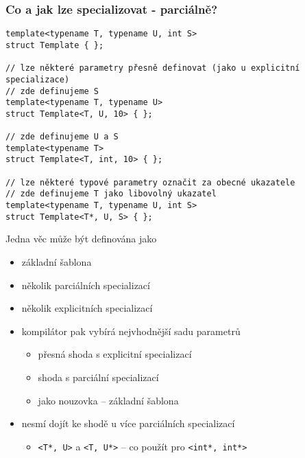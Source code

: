 \begin{frame}[fragile]
\frametitle{Co a jak lze specializovat - parciálně?}
\begin{yesblock}
\begin{lstlisting}[basicstyle=\small]
template<typename T, typename U, int S>
struct Template { }; 

// lze některé parametry přesně definovat (jako u explicitní specializace)
// zde definujeme S
template<typename T, typename U>
struct Template<T, U, 10> { }; 

// zde definujeme U a S
template<typename T>
struct Template<T, int, 10> { }; 

// lze některé typové parametry označit za obecné ukazatele
// zde definujeme T jako libovolný ukazatel
template<typename T, typename U, int S>
struct Template<T*, U, S> { }; 
\end{lstlisting}
\end{yesblock}
\end{frame}




\begin{frame}[fragile]
\begin{block}{Jedna věc může být definována jako}
\begin{itemize}
\item základní šablona
\item několik parciálních specializací
\item několik explicitních specializací
\end{itemize}
\end{block}

\begin{block}{}
\begin{itemize}
\item kompilátor pak vybírá nejvhodnější sadu parametrů
\begin{itemize}
\item přesná shoda s explicitní specializací
\item shoda s parciální specializací
\item jako nouzovka -- základní šablona
\end{itemize}
\item nesmí dojít ke shodě u více parciálních specializací
\begin{itemize}
\item \lstinline|<T*, U>| a \lstinline|<T, U*>| -- co použít pro \lstinline|<int*, int*>|
\end{itemize}
\end{itemize}
\end{block}
\end{frame}




